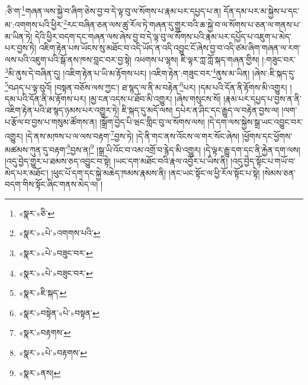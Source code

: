 :ཅི་ག་\footnote{«སྣར་»ཅི་}གཞན་ལས་སྐྱེ་བ་ཞིག་ཅེས་བྱ་བ་དེ་ལྟ་བུ་ལ་སོགས་པ་རྣམ་པར་དཔྱད་པ་ན། དོན་དམ་པར་མ་སྐྱེས་པ་དང་མ་:འགགས་པའི་ཕྱིར་\footnote{«སྣར་»«པེ་»འགགས་པའི་}རང་བཞིན་ཅན་ལས་ཚུ་རོལ་ཏེ་གཞན་དུ་གྱུར་བའི་ཆ་སྐྱེ་བ་ལ་སོགས་པ་ཅན་ལ་གནས་པ་མ་ཡིན་ཏེ། དེའི་ཕྱིར་བདག་དང་གཞན་ལས་ཞེས་བྱ་བ་དེ་ལྟ་བུ་ལ་སོགས་པའི་རྣམ་པར་དཔྱོད་པ་འཇུག་པ་མེད་པར་བྱས་ཏེ། འཇིག་རྟེན་པས་ཡོངས་སུ་མཐོང་བ་འདི་ཡོད་ན་འདི་འབྱུང་ངོ་ཞེས་བྱ་བ་འདི་ཙམ་ཞིག་གཞན་ལ་རག་ལས་པའི་འཇུག་པའི་སྒོ་ནས་ཁས་བླང་བར་བྱ་སྟེ། འཕགས་པ་ལྷས། ཇི་ལྟར་ཀླ་ཀློ་སྐད་གཞན་གྱིས། །:གཟུང་བར་\footnote{«སྣར་»«པེ་»བཟུང་བར་}མི་ནུས་དེ་བཞིན་དུ། །འཇིག་རྟེན་པ་ཡི་མ་རྟོགས་པར། །འཇིག་རྟེན་:གཟུང་བར་\footnote{«སྣར་»«པེ་»བཟུང་བར་}ནུས་མ་ཡིན། །ཞེས་:ཇི་སྐད་དུ་\footnote{«སྣར་»ཇི་སྐད་}བཤད་པ་ལྟ་བུའོ། །བསྟན་བཅོས་ལས་ཀྱང་། ཐ་སྙད་ལ་ནི་མ་བརྟེན་\footnote{«སྣར་»བསྟེན་«པེ་»བསྟན་}པར། །དམ་པའི་དོན་ནི་རྟོགས་མི་འགྱུར། །དམ་པའི་དོན་ནི་མ་རྟོགས་པར། །མྱ་ངན་འདས་པ་ཐོབ་མི་འགྱུར། །ཞེས་གསུངས་སོ། །རྣམ་པར་དཔྱད་པ་བྱས་ན་ནི་འཇིག་རྟེན་པའི་ཐ་སྙད་ཉམས་པར་འགྱུར་ཏེ། ཇི་སྐད་དུ་མདོ་ལས། དཔེར་ན་ཤིང་དང་རྒྱུད་ལ་བརྟེན་བྱས་ལ། །ལག་པ་རྩོལ་བ་བྱས་པ་གསུམ་ཚོགས་ན། །སྒྲོག་བྱེད་པི་ཝང་གླིང་བུ་ལ་སོགས་ལས། །དེ་དག་ལས་སྐྱེས་སྒྲ་ཡང་འབྱུང་བར་འགྱུར། །དེ་ནས་མཁས་པ་ལ་ལས་བརྟག་\footnote{«སྣར་»བརྟགས་}བྱས་ཏེ། །དེ་ནི་གང་ནས་འོངས་ལ་གར་སོང་ཞེས། །ཕྱོགས་དང་ཕྱོགས་མཚམས་ཀུན་དུ་བརྟག་\footnote{«སྣར་»«པེ་»བརྟགས་}བྱས་ན།\footnote{«སྣར་»ནས།} །སྒྲ་ཡི་འོང་བ་འམ་འགྲོ་བ་རྙེད་མི་འགྱུར། །དེ་ལྟར་རྒྱུ་དག་དང་ནི་རྐྱེན་དག་ལས། །འདུ་བྱེད་གྱུར་པ་ཐམས་ཅད་འབྱུང་བ་སྟེ། །ཡང་དག་མཐོང་བའི་རྣལ་འབྱོར་པ་ཡིས་ནི། །འདུ་བྱེད་སྟོང་པ་གཡོ་བ་མེད་པར་མཐོང་། །ཕུང་པོ་དག་དང་སྐྱེ་མཆེད་ཁམས་རྣམས་ནི། །ནང་ཡང་སྟོང་ལ་ཕྱི་རོལ་སྟོང་པ་སྟེ། །སེམས་ཅན་བདག་གིས་སྟོང་ཞིང་གནས་མེད་ལ། །
